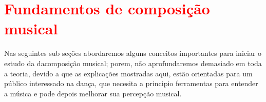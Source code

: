 
\chapter{\textcolor{red}{Fundamentos de composição musical}}
Nas seguintes sub seções abordaremos alguns conceitos importantes para iniciar o estudo da dacomposição musical;
porem, não aprofundaremos demasiado em toda a teoria, 
devido a que as explicações mostradas aqui, estão
orientadas para um público interessado na dança, que necesita a principio
ferramentas para entender a música e pode depois melhorar sua percepção musical. 


 
 
 


 



 

 


 
  
% 


